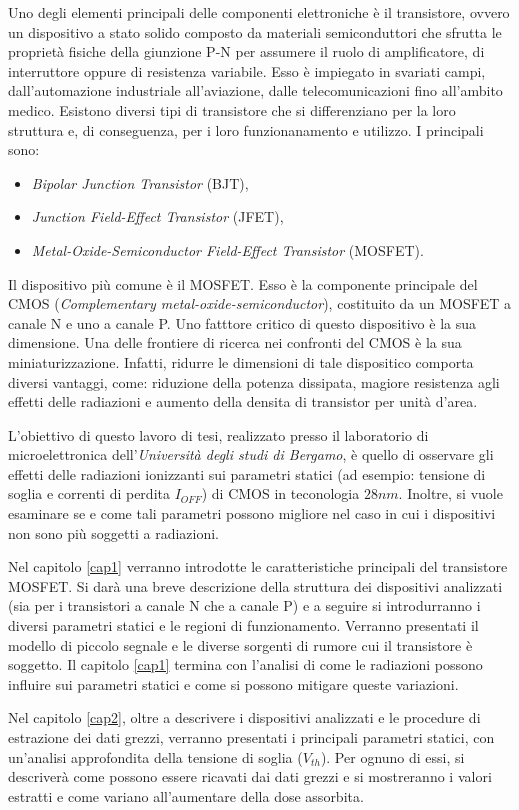 Uno degli elementi principali delle componenti elettroniche è il transistore, ovvero un dispositivo a stato solido composto da materiali semiconduttori che sfrutta le proprietà fisiche della giunzione P-N per assumere il ruolo di amplificatore, di interruttore oppure di resistenza variabile.
Esso è impiegato in svariati campi, dall'automazione industriale all'aviazione, dalle telecomunicazioni fino all'ambito medico.
Esistono diversi tipi di transistore che si differenziano per la loro struttura e, di conseguenza, per i loro funzionanamento e utilizzo. I principali sono:
\begin{itemize}
    \item \textit{Bipolar Junction Transistor} (BJT),
    \item \textit{Junction Field-Effect Transistor} (JFET),
    \item \textit{Metal-Oxide-Semiconductor Field-Effect Transistor} (MOSFET).
\end{itemize}
Il dispositivo più comune è il MOSFET. Esso è la componente principale del CMOS (\textit{Complementary metal-oxide-semiconductor}), costituito da un MOSFET a canale N e uno a canale P. Uno fatttore critico di questo dispositivo è la sua dimensione. Una delle frontiere di ricerca nei confronti del CMOS è la sua miniaturizzazione. Infatti, ridurre le dimensioni di tale dispositico comporta diversi vantaggi, come: riduzione della potenza dissipata, magiore resistenza agli effetti delle radiazioni e aumento della densita di transistor per unità d'area.  

\vspace*{0.5cm}

L'obiettivo di questo lavoro di tesi, realizzato presso il laboratorio di microelettronica dell'\textit{Università degli studi di Bergamo}, è quello di osservare gli effetti delle radiazioni ionizzanti sui parametri statici (ad esempio: tensione di soglia e correnti di perdita $I_{OFF}$) di CMOS in teconologia $28nm$. Inoltre, si vuole esaminare se e come tali parametri possono migliore nel caso in cui i dispositivi non sono più soggetti a radiazioni.     

\vspace*{0.5cm}

Nel capitolo \ref{cap1} verranno introdotte le caratteristiche principali del transistore MOSFET.
Si darà una breve descrizione della struttura dei dispositivi analizzati (sia per i transistori a canale N che a canale P) e a seguire si introdurranno i diversi parametri statici e le regioni di funzionamento. Verranno presentati il modello di piccolo segnale e le diverse sorgenti di rumore cui il transistore è soggetto. Il capitolo \ref{cap1} termina con l'analisi di come le radiazioni possono influire sui parametri statici e come si possono mitigare queste variazioni.

Nel capitolo \ref{cap2}, oltre a descrivere i dispositivi analizzati e le procedure di estrazione dei dati grezzi, verranno presentati i principali parametri statici, con un'analisi approfondita della tensione di soglia ($V_{th}$). Per ognuno di essi, si descriverà come possono essere ricavati dai dati grezzi e si mostreranno i valori estratti e come variano all'aumentare della dose assorbita.   
